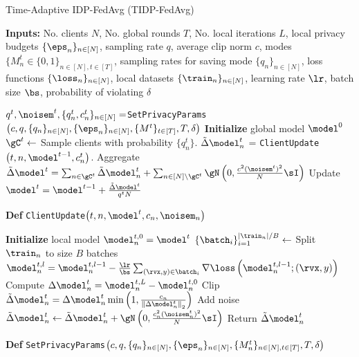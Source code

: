 

\begin{algorithm}[H]
\caption{Time-Adaptive IDP-FedAvg (TIDP-FedAvg)}
\textbf{Inputs:} No. clients $N$, No. global rounds $T$, No. local iterations $L$, local privacy budgets $\{\eps_n\}_{n\in [N]}$, sampling rate $q$, average clip norm $c$, modes $\{M_n^t \in\{0,1\}_{n\in [N], t\in [T]}$, sampling rates for saving mode $\{q_n\}_{n\in [N]}$, loss functions $\{\loss_n\}_{n\in [N]}$, local datasets $\{\train_n\}_{n\in [N]}$, learning rate $\lr$, batch size $\bs$, probability of violating $\delta$ 
\label{alg:tidpfl}
\begin{algorithmic}[1]
\State $q^t, \noisem^t, \{q_n^t, c_n^t\}_{n\in [N]}=$\texttt{SetPrivacyParams}$\left(c, q, \{q_n\}_{n\in [N]}, \{\eps_n\}_{n\in [N]}, \{M^t\}_{t\in [T]}, T, \delta\right)$
\State \textbf{Initialize} global model $\model^0$
\State $\gC^t \gets$ Sample clients with probability $\{q_n^t\}$.
\State $\tilde{\Delta}\model_n^t$ =  
\texttt{ClientUpdate}$\left(t, n,\model^{t-1}, c_n^t\right)$.
\EndFor
\State Aggregate $\tilde{\Delta}\model^t = \sum_{n\in \gC^t} \tilde{\Delta}\model_n^t +  \sum_{n\in  [N]\backslash \gC^t} \gN\left(0,\frac{c^2(\noisem^t)^2}{N}\sI\right)$
\State Update $\model^{t} = \model^{t-1} + \frac{\tilde{\Delta}\model^t}{q^tN}$
\EndFor
\Statex
\end{algorithmic}
\textbf{Def} \texttt{ClientUpdate}$\left(t, n,\model^{t}, c_n, \noisem_n\right)$
\begin{algorithmic}[1]
\State \textbf{Initialize} local model $\model_n^{t,0}=\model^t$
\State $\{\batch_i\}_{i=1}^{|\train_n|/B} \gets$ Split $\train_n$ to size $B$ batches
\State $\model_n^{t,l} = \model_n^{t,l-1}-\frac{\lr}{\bs}\sum_{(\rvx,y)\in \batch_i} \nabla\loss\left(\model_n^{t,l-1};(\rvx,y)\right)$
\EndFor
\EndFor
\State Compute $\Delta\model_n^t = \model_n^{t,L} - \model_n^{t,0}$
\State Clip $\tilde{\Delta}\model_n^{t} = \Delta\model_n^t\min\left(1,\frac{c_n}{\left\|\Delta\model_n^{t}\right\|_2}\right)$  
\State Add noise $\tilde{\Delta}\model_n^t \gets \tilde{\Delta}\model_n^t + \gN\left(0,\frac{c_n^2(\noisem_n^t)^2}{N}\sI\right)$
\State Return $\tilde{\Delta}\model_n^{t}$ 
\Statex
\end{algorithmic}
\textbf{Def} \texttt{SetPrivacyParams}$\left(c, q,  \{q_n\}_{n\in [N]}, \{\eps_n\}_{n\in [N]}, \{M_n^t\}_{n\in [N], t\in [T]}, T, \delta\right)$
\begin{algorithmic}[1]

\end{algorithmic}
\end{algorithm}
